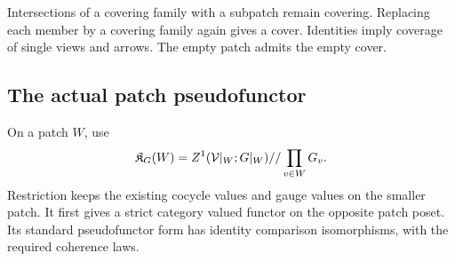 Intersections of a covering family with a subpatch remain covering. Replacing each member by a covering family again gives a cover. Identities imply coverage of single views and arrows. The empty patch admits the empty cover.

\subsection{The actual patch pseudofunctor}
On a patch \(W\), use
\[
 \mathfrak K_G(W)=Z^1(\mathcal V|_W;G|_W)//\prod_{v\in W}G_v.
\]
Restriction keeps the existing cocycle values and gauge values on the smaller patch. It first gives a strict category valued functor on the opposite patch poset. Its standard pseudofunctor form has identity comparison isomorphisms, with the required coherence laws.

